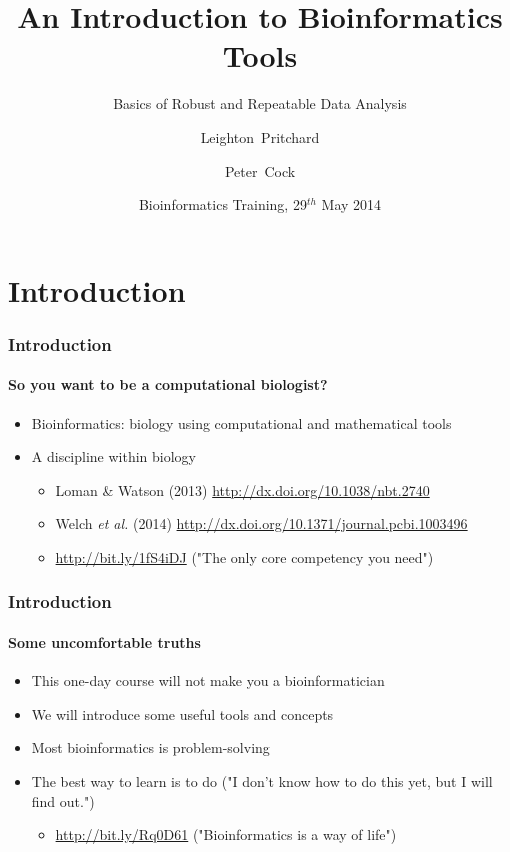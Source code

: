 \documentclass[table]{beamer}
\title[Intro to Bioinformatics] %
{An Introduction to Bioinformatics Tools}
\subtitle{Basics of Robust and Repeatable Data Analysis}
\author[Pritchard, Cock] %
{Leighton~Pritchard \and Peter~Cock}
\institute[The James Hutton Institute] %
{
  Information and Computational Sciences\\
  The James Hutton Institute
}
\date[May 2014] %
{Bioinformatics Training, 29$^{th}$ May 2014}
\begin{document}
  \frame[plain]{\titlepage}

  \section{Introduction}
  \begin{frame}
    \frametitle{Introduction}
    \framesubtitle{So you want to be a computational biologist?}
    \begin{itemize}
      \item Bioinformatics: biology using computational and mathematical tools
      \item A discipline within biology
      \begin{itemize}
        \item Loman \& Watson (2013) \url{http://dx.doi.org/10.1038/nbt.2740}
        \item Welch \textit{et al.} (2014) \url{http://dx.doi.org/10.1371/journal.pcbi.1003496}
        \item \url{http://bit.ly/1fS4iDJ} ("The only core competency you need")
      \end{itemize}
    \end{itemize}
  \end{frame}

  \begin{frame}
    \frametitle{Introduction}
    \framesubtitle{Some uncomfortable truths}
    \begin{itemize}
      \item This one-day course will not make you a bioinformatician
      \item We will introduce some useful tools and concepts
      \item Most bioinformatics is problem-solving
      \item The best way to learn is to do ("I don't know how to do this yet, but I will find out.")
      \begin{itemize}
        \item \url{http://bit.ly/Rq0D61} ("Bioinformatics is a way of life")
      \end{itemize}
    \end{itemize}
  \end{frame}
\end{document}
